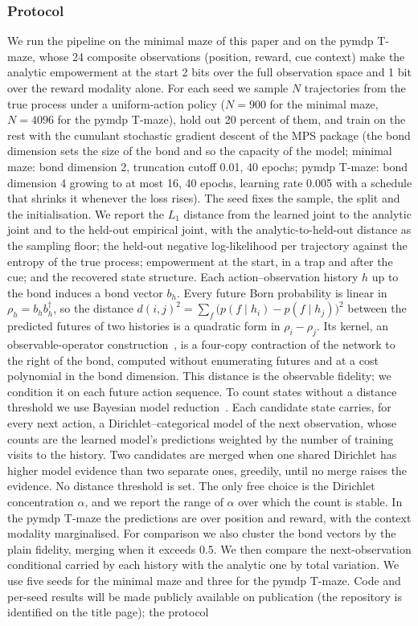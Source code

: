 \documentclass[pdflatex,sn-apa]{sn-jnl}%
\theoremstyle{definition}
\begin{document}
\subsubsection{Protocol} We run the pipeline on the minimal maze of this paper and on the pymdp T-maze, whose 24 composite observations (position, reward, cue context) make the analytic empowerment at the start 2 bits over the full observation space and 1 bit over the reward modality alone. For each seed we sample $N$ trajectories from the true process under a uniform-action policy ($N = 900$ for the minimal maze, $N = 4096$ for the pymdp T-maze), hold out 20 percent of them, and train on the rest with the cumulant stochastic gradient descent of the MPS package (the bond dimension sets the size of the bond and so the capacity of the model; minimal maze: bond dimension 2, truncation cutoff 0.01, 40 epochs; pymdp T-maze: bond dimension 4 growing to at most 16, 40 epochs, learning rate 0.005 with a schedule that shrinks it whenever the loss rises). The seed fixes the sample, the split and the initialisation. We report the $L_1$ distance from the learned joint to the analytic joint and to the held-out empirical joint, with the analytic-to-held-out distance as the sampling floor; the held-out negative log-likelihood per trajectory against the entropy of the true process; empowerment at the start, in a trap and after the cue; and the recovered state structure. Each action--observation history $h$ up to the bond induces a bond vector $b_h$. Every future Born probability is linear in $\rho_h = b_h b_h^\dagger$, so the distance $d(i,j)^2 = \sum_f \big(p(f \mid h_i) - p(f \mid h_j)\big)^2$ between the predicted futures of two histories is a quadratic form in $\rho_i - \rho_j$. Its kernel, an observable-operator construction~\citep{jaegerObservableOperatorModels2000}, is a four-copy contraction of the network to the right of the bond, computed without enumerating futures and at a cost polynomial in the bond dimension. This distance is the observable fidelity; we condition it on each future action sequence. To count states without a distance threshold we use Bayesian model reduction~\citep{fristonPostHocBayesian2011,fristonBayesianModelReduction2018}. Each candidate state carries, for every next action, a Dirichlet--categorical model of the next observation, whose counts are the learned model's predictions weighted by the number of training visits to the history. Two candidates are merged when one shared Dirichlet has higher model evidence than two separate ones, greedily, until no merge raises the evidence. No distance threshold is set. The only free choice is the Dirichlet concentration $\alpha$, and we report the range of $\alpha$ over which the count is stable. In the pymdp T-maze the predictions are over position and reward, with the context modality marginalised. For comparison we also cluster the bond vectors by the plain fidelity, merging when it exceeds 0.5. We then compare the next-observation conditional carried by each history with the analytic one by total variation. We use five seeds for the minimal maze and three for the pymdp T-maze. Code and per-seed results will be made publicly available on publication (the repository is identified on the title page); the protocol 
\end{document}
